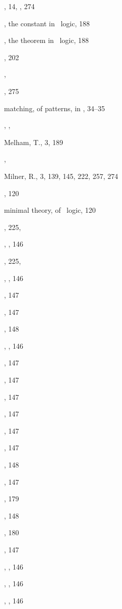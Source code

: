 \begin{theindex}
  \item {}, 14, , 274
  \item {}, the constant in \HOL\ logic, 188
  \item {}, the theorem in \HOL\ logic, 188
  \item {}, 202
  \item {}, 
  \item {}, 275
  \item matching, of patterns, in \ML, 34--35
  \item {}, , 
  \item Melham, T., 3, 189
  \item {}, 
  \item Milner, R., 3, 139, 145, 222, 257, 274
  \item {}, 120
  \item minimal theory, of \HOL\ logic, 120
  \item {}, 225, 
  \item {}, , 146
  \item {}, 225, 
  \item {}, , 146
  \item {}, 147
  \item {}, 147
  \item {}, 148
  \item {}, , 146
  \item {}, 147
  \item {}, 147
  \item {}, 147
  \item {}, 147
  \item {}, 147
  \item {}, 147
  \item {}, 148
  \item {}, 147
  \item {}, 179
  \item {}, 148
  \item {}, 180
  \item {}, 147
  \item {}, , 146
  \item {}, , 146
  \item {}, , 146

\end{theindex}
